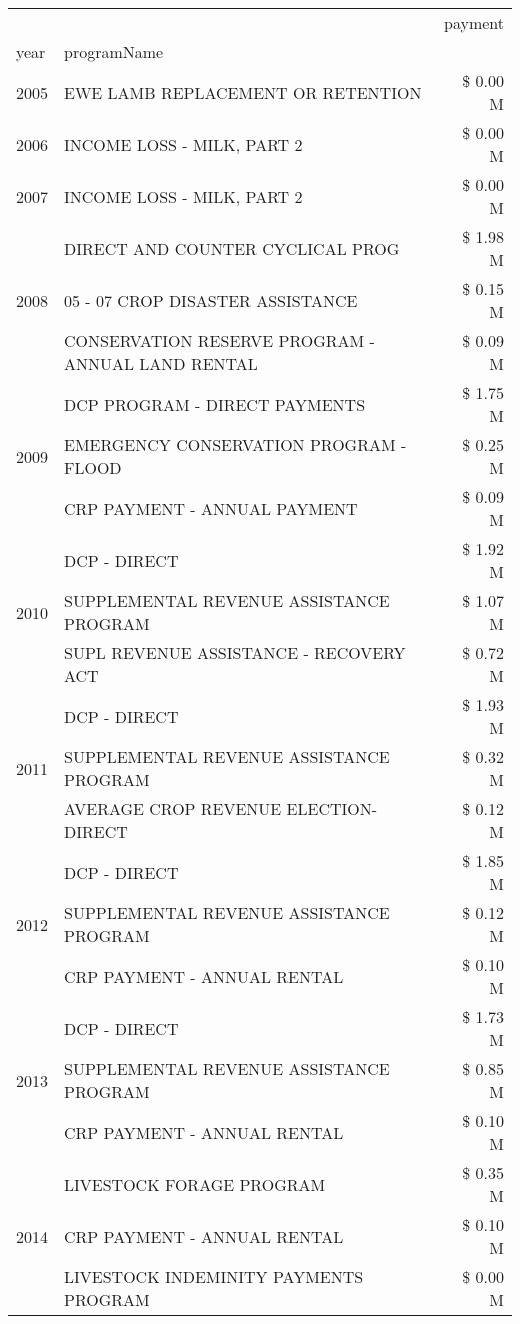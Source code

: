 \begin{tabular}{llr}
\toprule
 &  & payment \\
year & programName &  \\
\midrule
2005 & EWE LAMB REPLACEMENT OR RETENTION & \$ 0.00 M \\
\cline{1-3}
2006 & INCOME LOSS - MILK, PART 2 & \$ 0.00 M \\
\cline{1-3}
2007 & INCOME LOSS - MILK, PART 2 & \$ 0.00 M \\
\cline{1-3}
\multirow[t]{3}{*}{2008} & DIRECT AND COUNTER CYCLICAL PROG & \$ 1.98 M \\
 & 05 - 07 CROP DISASTER ASSISTANCE & \$ 0.15 M \\
 & CONSERVATION RESERVE PROGRAM - ANNUAL LAND RENTAL & \$ 0.09 M \\
\cline{1-3}
\multirow[t]{3}{*}{2009} & DCP PROGRAM - DIRECT PAYMENTS & \$ 1.75 M \\
 & EMERGENCY CONSERVATION PROGRAM - FLOOD & \$ 0.25 M \\
 & CRP PAYMENT - ANNUAL PAYMENT & \$ 0.09 M \\
\cline{1-3}
\multirow[t]{3}{*}{2010} & DCP - DIRECT & \$ 1.92 M \\
 & SUPPLEMENTAL REVENUE ASSISTANCE PROGRAM & \$ 1.07 M \\
 & SUPL REVENUE ASSISTANCE - RECOVERY ACT & \$ 0.72 M \\
\cline{1-3}
\multirow[t]{3}{*}{2011} & DCP - DIRECT & \$ 1.93 M \\
 & SUPPLEMENTAL REVENUE ASSISTANCE PROGRAM & \$ 0.32 M \\
 & AVERAGE CROP REVENUE ELECTION-DIRECT & \$ 0.12 M \\
\cline{1-3}
\multirow[t]{3}{*}{2012} & DCP - DIRECT & \$ 1.85 M \\
 & SUPPLEMENTAL REVENUE ASSISTANCE PROGRAM & \$ 0.12 M \\
 & CRP PAYMENT - ANNUAL RENTAL & \$ 0.10 M \\
\cline{1-3}
\multirow[t]{3}{*}{2013} & DCP - DIRECT & \$ 1.73 M \\
 & SUPPLEMENTAL REVENUE ASSISTANCE PROGRAM & \$ 0.85 M \\
 & CRP PAYMENT - ANNUAL RENTAL & \$ 0.10 M \\
\cline{1-3}
\multirow[t]{3}{*}{2014} & LIVESTOCK FORAGE PROGRAM & \$ 0.35 M \\
 & CRP PAYMENT - ANNUAL RENTAL & \$ 0.10 M \\
 & LIVESTOCK INDEMINITY PAYMENTS PROGRAM & \$ 0.00 M \\

\end{tabular}
